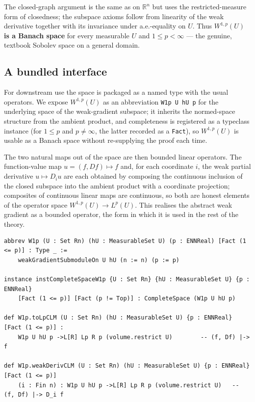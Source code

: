 ﻿\documentclass[12pt, a4paper]{article}
\renewcommand{\_}{\origunderscore\allowbreak}
\theoremstyle{definition}
\theoremstyle{plain}
\begin{document}
The closed-graph argument is the same as on $\mathbb{R}^n$ but uses the restricted-measure
form of closedness; the subspace axioms follow from linearity of the weak derivative together
with its invariance under a.e.-equality on $U$. Thus \textbf{$W^{1,p}(U)$ is a Banach space} for
every measurable $U$ and $1\le p<\infty$ --- the genuine, textbook Sobolev space on a general
domain.

\subsection{A bundled interface}

For downstream use the space is packaged as a named type with the usual operators. We expose
$W^{1,p}(U)$ as an abbreviation \texttt{W1p U hU p} for the underlying space of the weak-gradient
subspace; it inherits the normed-space structure from the ambient product, and completeness is
registered as a typeclass instance (for $1\le p$ and $p\ne\infty$, the latter recorded as a
\texttt{Fact}), so $W^{1,p}(U)$ is usable as a Banach space without re-supplying the proof each
time.

The two natural maps out of the space are then bounded linear operators. The function-value map
$u=(f,Df)\mapsto f$ and, for each coordinate $i$, the weak partial derivative $u\mapsto D_iu$ are
each obtained by composing the continuous inclusion of the closed subspace into the ambient
product with a coordinate projection; composites of continuous linear maps are continuous, so both
are honest elements of the operator space $W^{1,p}(U)\to L^p(U)$. This realises the abstract weak
gradient as a bounded operator, the form in which it is used in the rest of the theory.

\begin{lstlisting}[caption={W^{1,p}(U) as a bundled Banach space with bounded operators (proved)}]
abbrev W1p (U : Set Rn) (hU : MeasurableSet U) (p : ENNReal) [Fact (1 <= p)] : Type _ :=
    weakGradientSubmoduleOn U hU (n := n) (p := p)

instance instCompleteSpaceW1p {U : Set Rn} {hU : MeasurableSet U} {p : ENNReal}
    [Fact (1 <= p)] [Fact (p != Top)] : CompleteSpace (W1p U hU p)

def W1p.toLpCLM (U : Set Rn) (hU : MeasurableSet U) {p : ENNReal} [Fact (1 <= p)] :
    W1p U hU p ->L[R] Lp R p (volume.restrict U)        -- (f, Df) |-> f

def W1p.weakDerivCLM (U : Set Rn) (hU : MeasurableSet U) {p : ENNReal} [Fact (1 <= p)]
    (i : Fin n) : W1p U hU p ->L[R] Lp R p (volume.restrict U)   -- (f, Df) |-> D_i f
\end{lstlisting}
\end{document}
